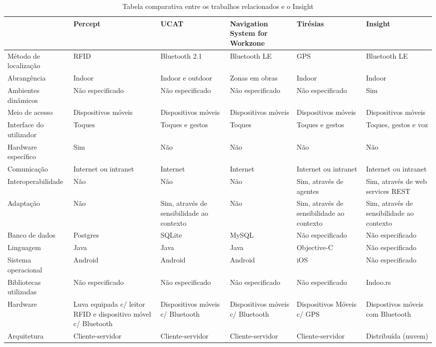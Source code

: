 \documentclass[english,brazilian]{UNISINOSmonografia}
\begin{document}
\FloatBarrier
\begin{table}
	\caption{Tabela comparativa entre os trabalhos relacionados e o Insight}
	\label{tab:trabalalhosRelacionadosEInsight}
	\centering%
	\begin{minipage}{1\textwidth}
	\begin{adjustbox}{max width=\textwidth}
		\begin{tabular}{ | p{3cm} | p{3cm} | p{3cm} | p{3cm} | p{3cm} | p{3cm} | }
\hline
	 & Percept & UCAT & Navigation System for Workzone & Tirésias & Insight \\ \hline
	Método de localização & RFID & Bluetooth 2.1 & Bluetooth LE & GPS & Bluetooth LE \\ \hline
	Abrangência & Indoor & Indoor e outdoor & Zonas em obras & Indoor & Indoor \\ \hline
	Ambientes dinâmicos & Não especificado & Não especificado & Não especificado & Não especificado & Sim \\ \hline
	Meio de acesso & Dispositivos móveis & Dispositivos móveis & Dispositivos móveis & Dispositivos móveis & Dispositivos móveis \\ \hline
	Interface do utilizador & Toques & Toques e gestos & Toques & Toques e gestos & Toques, gestos e voz \\ \hline
	Hardware específico & Sim & Não & Não & Não & Não \\ \hline
	Comunicação & Internet ou intranet & Internet & Internet & Internet ou intranet & Internet ou intranet \\ \hline
	Interoperabilidade & Não & Não & Não & Sim, através de agentes & Sim, através de web services REST \\ \hline
	Adaptação & Não & Sim, através de sensibilidade ao contexto & Não & Sim, através de sensibilidade ao contexto & Sim, através de sensibilidade ao contexto \\ \hline
	Banco de dados & Postgres & SQLite & MySQL & Não especificado & Não especificado \\ \hline
	Linguagem & Java & Java & Java & Objective-C & Não especificado \\ \hline
	Sistema operacional & Android & Android & Android & iOS & Não especificado \\ \hline
	Bibliotecas utilizadas & Não especificado & Não especificado & Não especificado & Não especificado & Indoo.rs \\ \hline
	Hardware & Luva equipada c/ leitor RFID e dispositivo móvel c/ Bluetooth & Dispositivos móveis c/ Bluetooth & Dispositivos móveis c/ Bluetooth & Dispositivos Móveis c/ GPS & Dispostivos móveis com Bluetooth \\ \hline
	Arquitetura & Cliente-servidor & Cliente-servidor & Cliente-servidor & Cliente-servidor & Distribuída (nuvem) \\ \hline
		\end{tabular}
		\end{adjustbox}
	\end{minipage}
\end{table}
\FloatBarrier
	
\end{document}
